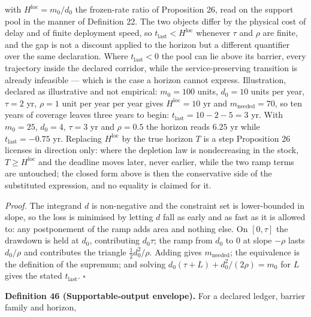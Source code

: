 \documentclass[11pt]{article}
\begin{document}
 with \(H^{\mathrm{loc}} =\allowbreak{} m_0/\allowbreak{}d_0\) the frozen-rate ratio of Proposition 26, read on the support pool in the manner of Definition 22. The two objects differ by the physical cost of delay and of finite deployment speed, so \(t_{\mathrm{last}} < H^{\mathrm{loc}}\) whenever \(\tau\) and \(\rho\) are finite, and the gap is not a discount applied to the horizon but a different quantifier over the same declaration. Where \(t_{\mathrm{last}} < 0\) the pool can lie above its barrier, every trajectory inside the declared corridor, while the service-preserving transition is already infeasible --- which is the case a horizon cannot express. Illustration, declared as illustrative and not empirical: \(m_0 = 100\) units, \(d_0 = 10\) units per year, \(\tau = 2\) yr, \(\rho = 1\) unit per year per year gives \(H^{\mathrm{loc}} = 10\) yr and \(m_{\mathrm{needed}} = 70\), so ten years of coverage leaves three years to begin: \(t_{\mathrm{last}} =\allowbreak{} 10 - 2 - 5 =\allowbreak{} 3\) yr. With \(m_0 = 25\), \(d_0 = 4\), \(\tau = 3\) yr and \(\rho = 0.5\) the horizon reads \(6.25\) yr while \(t_{\mathrm{last}} = -0.75\) yr. Replacing \(H^{\mathrm{loc}}\) by the true horizon \(T\) is a step Proposition 26 licenses in direction only: where the depletion law is nondecreasing in the stock, \(T \ge H^{\mathrm{loc}}\) and the deadline moves later, never earlier, while the two ramp terms are untouched; the closed form above is then the conservative side of the substituted expression, and no equality is claimed for it.

\emph{Proof.} The integrand \(d\) is non-negative and the constraint set is lower-bounded in slope, so the loss is minimised by letting \(d\) fall as early and as fast as it is allowed to: any postponement of the ramp adds area and nothing else. On \([0, \tau]\) the drawdown is held at \(d_0\), contributing \(d_0 \tau\); the ramp from \(d_0\) to \(0\) at slope \(-\rho\) lasts \(d_0/\rho\) and contributes the triangle \(\tfrac{1}{2} d_0^{2}/\rho\). Adding gives \(m_{\mathrm{needed}}\); the equivalence is the definition of the supremum; and solving \(d_0(\tau +\allowbreak{} L) +\allowbreak{} d_0^2/(2\rho) =\allowbreak{} m_0\) for \(L\) gives the stated \(t_{\mathrm{last}}\). \(\square\)

\textbf{Definition 46 (Supportable-output envelope).} For a declared ledger, barrier family and horizon, 

\par\noindent{}\par
\end{document}
